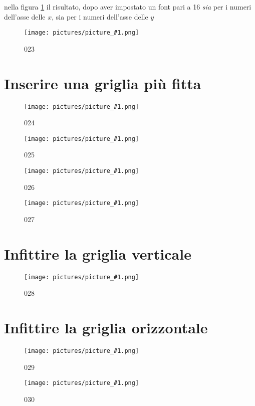 \documentclass[17pt]{extarticle}
\newcommand{\pict}[1]{
\begin{figure}[h!]		
	\centering
   	\texttt{[image: pictures/picture\_\#1.png]}
  	\caption{#1}
   	\label{fig:LibreOfficeCalc#1}
\end{figure}
}
\begin{document}
nella figura \ref{fig:LibreOfficeCalc023} il risultato, dopo aver impostato un font pari a 16 \emph{sia} per i numeri dell'asse delle $x$, sia per i numeri dell'asse delle $y$

%
\pict{023}



\section{Inserire una griglia più fitta}

%
\pict{024}


%
\pict{025}


%
\pict{026}


%
\pict{027}







\section{Infittire la griglia verticale}



%
\pict{028}

\newpage


\section{Infittire la griglia orizzontale}

%
\pict{029}


%
\pict{030}
\end{document}
